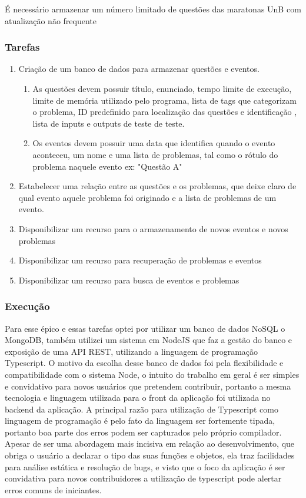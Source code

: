 É necessário armazenar um número limitado de questões das maratonas UnB com atualização não frequente

\subsubsection{Tarefas}

\begin{enumerate}
    \item Criação de um banco de dados para armazenar questões e eventos.
    \begin{enumerate}
        \item As questões devem possuir título, enunciado, tempo limite de execução, limite de memória utilizado pelo programa, lista de tags que categorizam o problema, ID predefinido para localização das questões e identificação , lista de inputs e outputs de teste de teste.
        \item Os eventos devem possuir uma data que identifica quando o evento aconteceu, um nome e uma lista de problemas, tal como o rótulo do problema naquele evento ex: "Questão A"
    \end{enumerate}
    \item Estabelecer uma relação entre as questões e os problemas, que deixe claro de qual evento aquele problema foi originado e a lista de problemas de um evento.
    \item Disponibilizar um recurso para o armazenamento de novos eventos e novos problemas
    \item Disponibilizar um recurso para recuperação de problemas e eventos
    \item Disponibilizar um recurso para busca de eventos e problemas
\end{enumerate}



\subsubsection{Execução}

Para esse épico e essas tarefas optei por utilizar um banco de dados NoSQL o MongoDB, também utilizei um sistema em NodeJS que faz a gestão do banco e exposição de uma API REST, utilizando a linguagem de programação Typescript. 
	O motivo da escolha desse banco de dados foi pela flexibilidade e compatibilidade com o sistema Node, o intuito do trabalho em geral é ser simples e convidativo para novos usuários que pretendem contribuir, portanto a mesma tecnologia e linguagem utilizada para o front da aplicação foi utilizada no backend da aplicação. 
A principal razão para utilização de Typescript como linguagem de programação é pelo fato da linguagem ser fortemente tipada, portanto boa parte dos erros podem ser capturados pelo próprio compilador. Apesar de ser uma abordagem mais incisiva em relação ao desenvolvimento, que obriga o usuário a declarar o tipo das suas funções e objetos, ela traz facilidades para análise estática e resolução de bugs, e visto que o foco da aplicação é ser convidativa para novos contribuidores a utilização de typescript pode alertar erros comuns de iniciantes. 

